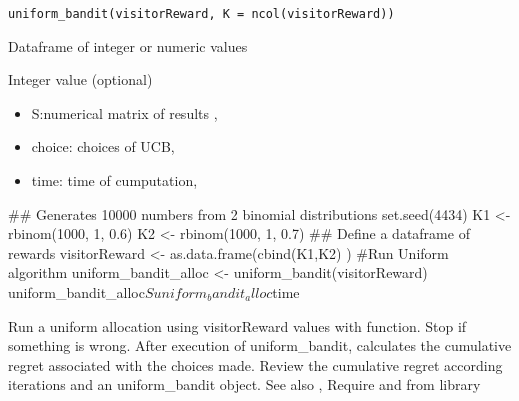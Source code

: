 \documentclass[letterpaper]{book}
\begin{document}
%
\begin{Usage}
\begin{verbatim}
uniform_bandit(visitorReward, K = ncol(visitorReward))
\end{verbatim}
\end{Usage}
%
\begin{Arguments}
\begin{ldescription}
\item[\code{visitorReward}] Dataframe of integer or numeric values

\item[\code{K}] Integer value (optional)
\end{ldescription}
\end{Arguments}
%
\begin{Value}
\begin{itemize}
 List of element:
\item S:numerical matrix of results ,
\item choice: choices of UCB,
\item time: time of cumputation,

\end{itemize}

\end{Value}
%
\begin{Examples}
\begin{ExampleCode}
## Generates 10000 numbers from 2 binomial  distributions
set.seed(4434)
K1 <- rbinom(1000, 1, 0.6)
K2 <- rbinom(1000, 1, 0.7)
## Define a dataframe of rewards
visitorReward <- as.data.frame(cbind(K1,K2) )
#Run Uniform algorithm
uniform_bandit_alloc  <- uniform_bandit(visitorReward)
uniform_bandit_alloc$S
uniform_bandit_alloc$time
\end{ExampleCode}
\end{Examples}
%
\begin{Description}\relax
Run a uniform allocation using visitorReward values with  function.
Stop if something is wrong.
After execution of uniform\_bandit, calculates the cumulative regret
associated with the choices made.
Review the cumulative regret according iterations and an uniform\_bandit object.
See also , 
Require  and  from  library
\end{Description}
\end{document}
